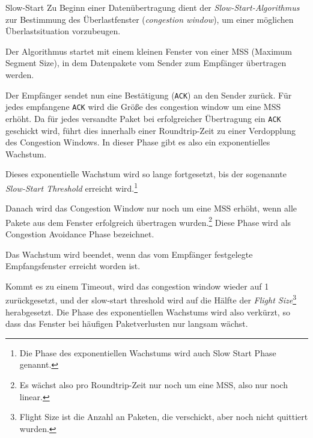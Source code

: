 \begin{bonus}{Slow-Start}
    Zu Beginn einer Datenübertragung dient der \emph{Slow-Start-Algorithmus} zur Bestimmung des Überlastfenster (\emph{congestion window}), um einer möglichen Überlastsituation vorzubeugen.

    Der Algorithmus startet mit einem kleinen Fenster von einer MSS (Maximum Segment Size), in dem Datenpakete vom Sender zum Empfänger übertragen werden.

    Der Empfänger sendet nun eine Bestätigung (\texttt{ACK}) an den Sender zurück.
    Für jedes empfangene \texttt{ACK} wird die Größe des congestion window um eine MSS erhöht.
    Da für jedes versandte Paket bei erfolgreicher Übertragung ein \texttt{ACK} geschickt wird, führt dies innerhalb einer Roundtrip-Zeit zu einer Verdopplung des Congestion Windows.
    In dieser Phase gibt es also ein exponentielles Wachstum.

    Dieses exponentielle Wachstum wird so lange fortgesetzt, bis der sogenannte \emph{Slow-Start Threshold} erreicht wird.\footnote{Die Phase des exponentiellen Wachstums wird auch Slow Start Phase genannt.}

    Danach wird das Congestion Window nur noch um eine MSS erhöht, wenn alle Pakete aus dem Fenster erfolgreich übertragen wurden.\footnote{Es wächst also pro Roundtrip-Zeit nur noch um eine MSS, also nur noch linear. }
    Diese Phase wird als Congestion Avoidance Phase bezeichnet.

    Das Wachstum wird beendet, wenn das vom Empfänger festgelegte Empfangsfenster erreicht worden ist.

    Kommt es zu einem Timeout, wird das congestion window wieder auf 1 zurückgesetzt, und der slow-start threshold wird auf die Hälfte der \emph{Flight Size}\footnote{Flight Size ist die Anzahl an Paketen, die verschickt, aber noch nicht quittiert wurden.} herabgesetzt.
    Die Phase des exponentiellen Wachstums wird also verkürzt, so dass das Fenster bei häufigen Paketverlusten nur langsam wächst.
\end{bonus}

